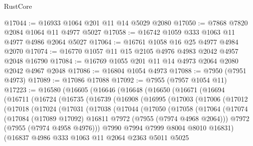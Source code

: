 \begin{lexlean}{RustCore}
\begin{coremodule}
@17044 := @16933 @1064 @201 @11 @14 @5029 @2080
@17050 := @7868 @7820 @2084 @1064 @11 @4977 @5027
@17058 := @16742 @1059 @333 @1063 @11 @4977 @4986 @2064 @5027
@17064 := @16761 @1058 @16 @25 @4977 @4984 @2070
@17074 := @16770 @1057 @11 @15 @2105 @4976 @4983 @2042 @4957 @2048 @16790
@17084 := @16769 @1055 @201 @11 @14 @4973 @2064 @2080 @2042 @4967 @2048
@17086 := @16804 @1054 @4973
@17088 := @7950 (@7951 @4973)
@17089 := @17086 @17088
@17092 := @7955 (@7957 @1054 @11)
@17223 := @16580
    (@16605
      (@16646
        (@16648
          (@16650
            (@16671
              (@16694
                (@16711
                  (@16724
                    (@16735
                      (@16739
                        (@16908
                          (@16995
                            (@17003
                              (@17006
                                (@17012
                                  (@17018
                                    (@17024
                                      (@17031
                                        (@17038
                                          (@17044
                                            (@17050
                                              (@17058
                                                (@17064
                                                  (@17074
                                                    (@17084
                                                      (@17089 @17092)
                                                      @16811
                                                      @7972
                                                      (@7955 (@7974 @4968 @2064)))
                                                    @7972
                                                    (@7955 (@7974 @4958 @4976)))
                                                  @7990
                                                  @7994
                                                  @7999
                                                  @8004
                                                  @8010
                                                  @16831)
                                                (@16837
                                                  @4986
                                                  @333
                                                  @1063
                                                  @11
                                                  @2064
                                                  @2363
                                                  @5011
                                                  @5025

\end{coremodule}
\end{lexlean}

